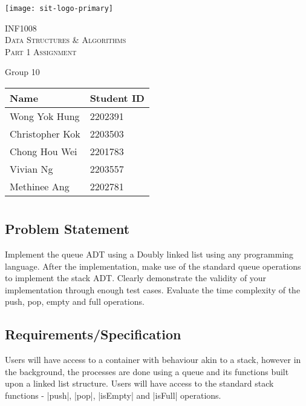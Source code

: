 \documentclass{report}
\begin{document}
\begin{titlepage}
	\centering
	\texttt{[image: sit-logo-primary]}\par\vspace{1cm}
	{\scshape\Huge{INF1008}\\Data Structures \& Algorithms\\\Large{Part 1 Assignment}\par}
	\vspace{1cm}
	{\huge{Group 10}\par}
	\vspace{0.5cm}
	\begin{table}[H]
		\large
		\centering\begin{tabular}{ll}
			\toprule
			Name & Student ID\\
			\midrule
			Wong Yok Hung & 2202391\\
			Christopher Kok & 2203503\\
			Chong Hou Wei & 2201783\\
			Vivian Ng & 2203557\\
			Methinee Ang & 2202781\\
			\bottomrule
		\end{tabular}
	\end{table}
	\vfill
\end{titlepage}
\newpage%
\tableofcontents
\listoffigures
\pagebreak
\chapter{}
\section{Problem Statement}
Implement the queue ADT using a Doubly linked list using any programming language. After the implementation, make use of the standard queue operations to implement the stack ADT\@. Clearly demonstrate the validity of your implementation through enough test cases. Evaluate the time complexity of the push, pop, empty and full operations.
\section{Requirements/Specification}
Users will have access to a container with behaviour akin to a stack, however in the background, the processes are done using a queue and its functions built upon a linked list structure. Users will have access to the standard stack functions - |push|, |pop|, |isEmpty| and |isFull| operations.
\end{document}
